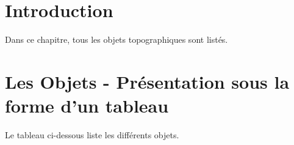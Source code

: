 \documentclass[12pt,titlepage,oneside]{book}
\begin{document}
\section{Introduction}
Dans ce chapitre, tous les objets topographiques sont listés.


\section{Les Objets - Présentation sous la forme d'un tableau}
Le tableau ci-dessous liste les différents objets.
\vspace{\baselineskip}
\end{document}
